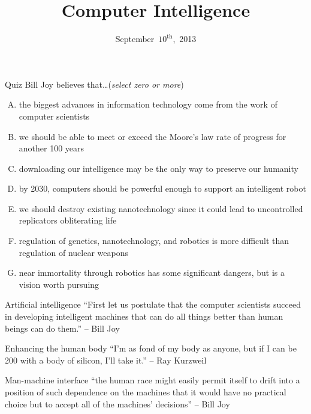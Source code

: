 \documentclass{beamer}
\title{Computer Intelligence}
\date{September~$10^{\text{th}}$,~2013}
\begin{document}
\begin{frame}
\titlepage
\end{frame}

\begin{frame}{Quiz}
Bill Joy believes that\ldots \hfill (\emph{select zero or more})
\begin{enumerate}[(A)]
\item<1> the biggest advances in information technology come from the work of computer scientists %
\item<1> we should be able to meet or exceed the Moore's law rate of progress for another 100 years %
\item<1> downloading our intelligence may be the only way to preserve our humanity %
\item<1-2> by 2030, computers should be powerful enough to support an intelligent robot
\item<1> we should destroy existing nanotechnology since it could lead to uncontrolled replicators obliterating life %
\item<1-2> regulation of genetics, nanotechnology, and robotics is more difficult than regulation of nuclear weapons %
\item<1> near immortality through robotics has some significant dangers, but is a vision worth pursuing
\end{enumerate}
\end{frame}

\begin{frame}{Artificial intelligence}
``First let us postulate that the computer scientists succeed in developing intelligent machines that can do all things better than human beings can do them.'' -- Bill Joy \\
\bigskip
\href{http://www.npr.org/player/v2/mediaPlayer.html?action=1&t=1&islist=false&id=155792609&m=155798855}{}
\end{frame}

\begin{frame}{Enhancing the human body}
``I'm as fond of my body as anyone, but if I can be 200 with a body of silicon, I'll take it.'' -- Ray Kurzweil \\
\bigskip
\href{http://www.youtube.com/watch?v=mO0xNI3xpmE}{}
\end{frame}

\begin{frame}{Man-machine interface}
``the human race might easily permit itself to drift into a position of such dependence on the machines that it would have no practical choice but to accept all of the machines' decisions'' -- Bill Joy \\
\bigskip
\href{https://www.youtube.com/watch?v=ogBX18maUiM}{}
\end{frame}
\end{document}
